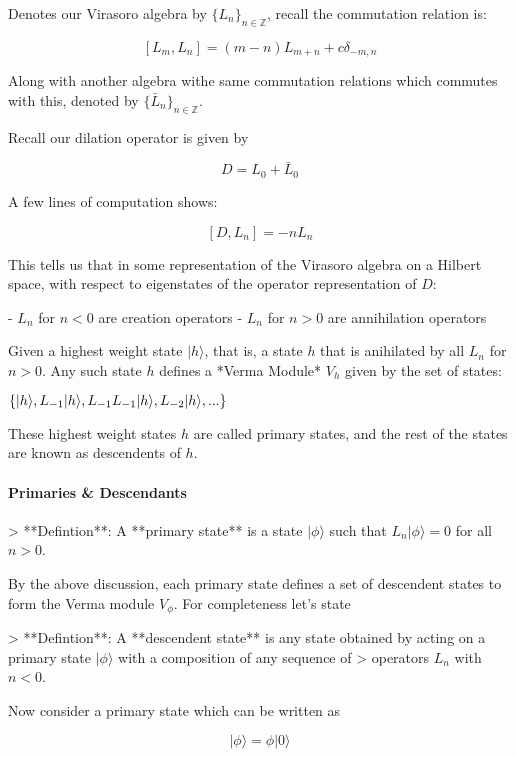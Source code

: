 Denotes our Virasoro algebra by $\{ L _n \}_{n \in \mathbb Z}$, recall the commutation relation is:

$$
[L_m, L_n]= (m-n)L_{m + n} + c \delta_{-m, n}
$$

Along with another algebra withe same commutation relations which commutes with this, denoted by $\{ \bar L _n \}_{n \in \mathbb Z}$.

Recall our dilation operator is given by

$$D = L_0 + \bar L_0$$

A few lines of computation shows:

$$[D, L_n] = - n L_n$$

This tells us that in some representation of the Virasoro algebra on a Hilbert space,  with respect to eigenstates of the operator representation of $D$:

- $L_n$ for $n < 0$ are creation operators
- $L_n$ for $n > 0$ are annihilation operators

Given a highest weight state $|h\rangle$, that is, a state $h$ that is anihilated by all $L_n$ for $n > 0$. Any such state $h$ defines a *Verma Module* $V_h$ given by the set of states:

$\{ |h \rangle, \\  L_{-1}|h \rangle,  \\ L_{-1}L_{-1}|h \rangle, L_{-2}|h\rangle,\\ ... \}$

These highest weight states $h$ are called primary states, and the rest of the states are known as descendents of $h$.  

\paragraph{ Primaries \& Descendants}

> **Defintion**: A **primary state** is a state $|\phi \rangle$ such that $L_n | \phi \rangle = 0$ for all $n > 0$.

By the above discussion, each primary state defines a set of descendent states to form the Verma module $V_\phi$. For completeness let's state

> **Defintion**: A **descendent state** is any state obtained by acting on a primary state $|\phi \rangle$ with a composition of any sequence of
> operators $L_n$ with $n < 0$.

Now consider a primary state which can be written as

$$ |\phi \rangle = \phi |0 \rangle$$

